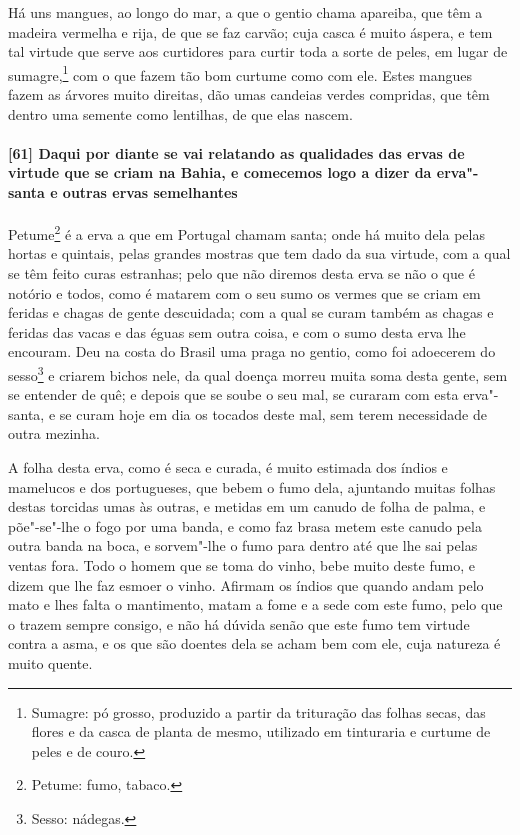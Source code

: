 Há uns mangues, ao longo do mar, a que o gentio chama apareiba, que têm a madeira vermelha
e rija, de que se faz carvão; cuja casca é muito áspera, e tem tal virtude que serve aos
curtidores para curtir toda a sorte de peles, em lugar de sumagre,\footnote{ Sumagre: pó
grosso, produzido a partir da trituração das folhas secas, das flores e da casca de planta
de mesmo, utilizado em tinturaria e curtume de peles e de couro.} com o que fazem tão bom
curtume como com ele. Estes mangues fazem as árvores
muito direitas, dão umas candeias verdes compridas, que têm
dentro uma semente como lentilhas, de que elas nascem.

\paragraph{[61] Daqui por diante se vai relatando as qualidades das ervas de virtude que se
criam na Bahia, e comecemos logo a dizer da erva"-santa e outras ervas semelhantes}\quad
Petume\footnote{ Petume: fumo, tabaco.} é a erva a que em Portugal chamam santa; onde há
muito dela pelas hortas e quintais, pelas grandes mostras que tem dado da sua virtude, com
a qual se têm feito curas estranhas; pelo que não diremos desta erva se não o que é
notório e todos, como é matarem com o seu sumo os vermes que se criam em feridas e chagas
de gente descuidada; com a qual se curam também as chagas e feridas das vacas e das éguas
sem outra coisa, e com o sumo desta erva lhe encouram. Deu na costa do Brasil uma praga no
gentio, como foi adoecerem do sesso\footnote{ Sesso: nádegas.} e criarem bichos
nele, da qual doença morreu muita soma desta gente, sem se entender de quê; e depois que
se soube o seu mal, se curaram com esta erva"-santa, e se curam hoje em dia os tocados
deste mal, sem terem necessidade de outra mezinha.

A folha desta erva, como é seca e curada, é muito estimada dos índios e mamelucos e dos
portugueses, que bebem o fumo dela, ajuntando muitas folhas destas torcidas umas às
outras, e metidas em um canudo de folha de palma, e põe"-se"-lhe o fogo por uma banda, e
como faz brasa metem este canudo pela outra banda na boca, e sorvem"-lhe o fumo para dentro
até que lhe sai pelas ventas fora. Todo o homem que se toma do vinho, bebe muito deste
fumo, e dizem que lhe faz esmoer o vinho. Afirmam os índios que quando andam pelo mato e
lhes falta o mantimento, matam a fome e a sede com este fumo, pelo que o trazem sempre
consigo, e não há dúvida senão que este fumo tem virtude contra a asma, e os que são
doentes dela se acham bem com ele, cuja natureza é muito quente.

